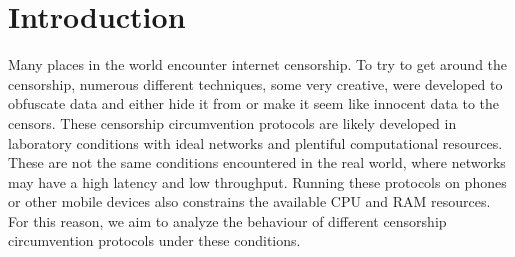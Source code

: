 
\chapter{Introduction}


Many places in the world encounter internet censorship. To try to get around the censorship, numerous different techniques, some very creative, were developed to obfuscate data and either hide it from or make it seem like innocent data to the censors. These censorship circumvention protocols are likely developed in laboratory conditions with ideal networks and plentiful computational resources. These are not the same conditions encountered in the real world, where networks may have a high latency and low throughput. Running these protocols on phones or other mobile devices also constrains the available CPU and RAM resources. For this reason, we aim to analyze the behaviour of different censorship circumvention protocols under these conditions.
